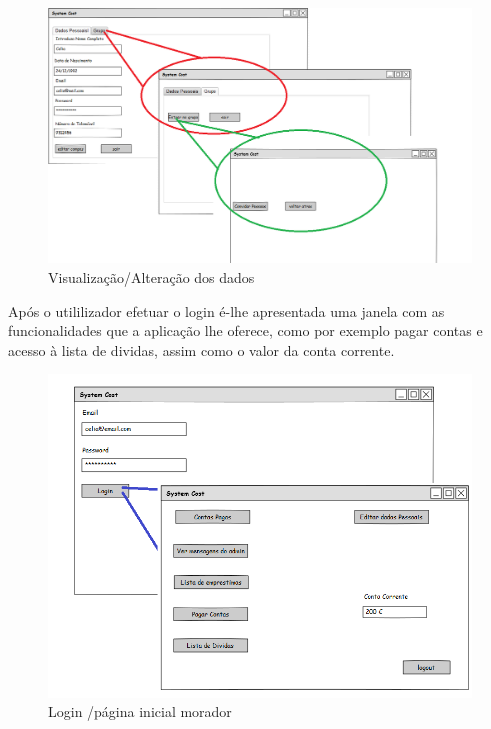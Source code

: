 \begin{figure}[htb!]
	\centering
	\includegraphics[scale=0.45]{imagens/mockups/consultardados}  
	\caption{Visualização/Alteração dos dados }  
\end{figure}


Após o utililizador efetuar o login é-lhe apresentada uma janela com as funcionalidades que a aplicação lhe oferece, como por exemplo pagar contas e acesso à lista de dividas, assim como o valor da conta corrente. 

\begin{figure}[htb!]
	\centering
	\includegraphics[scale=0.5]{imagens/mockups/logUtilizador}  
	\caption{Login /página inicial morador}  
\end{figure}


